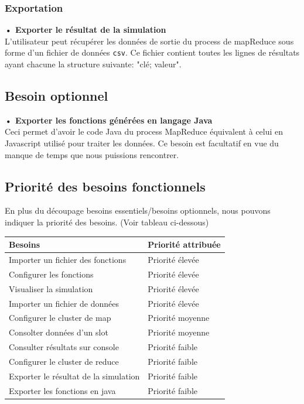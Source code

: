 \documentclass[12pt,a4paper]{article}
\begin{document}
\subsubsection{Exportation}

\textbf{• Exporter le résultat de la simulation\\} L'utilisateur peut récupérer les données de sortie du process de mapReduce sous forme d'un fichier de données {\tt csv}. Ce fichier contient toutes les lignes de résultats ayant chacune la structure suivante: "clé; valeur".


\subsection{Besoin optionnel}

\textbf{• Exporter les fonctions générées en langage Java\\} Ceci permet d'avoir le code Java du process MapReduce équivalent à celui en Javascript utilisé pour traiter les données. Ce besoin est facultatif en vue du manque de temps que nous puissions rencontrer.

\subsection{Priorité des besoins fonctionnels}
En plus du découpage besoins essentiels/besoins optionnels, nous pouvons indiquer la priorité des besoins. (Voir tableau ci-dessous)
\begin{center}
\begin{tabularx}{\textwidth}{|X|X|}
  \hline {\bf Besoins} & {\bf Priorité attribuée} \\[4ex]

  \hline Importer un fichier des fonctions & Priorité élevée\\[2ex]
  \hline Configurer les fonctions & Priorité élevée\\[2ex]
  \hline Visualiser la simulation & Priorité élevée\\[2ex]
  \hline Importer un fichier de données & Priorité élevée\\[2ex]
  \hline Configurer le cluster de map & Priorité moyenne\\[2ex]
  \hline Consolter données d'un slot & Priorité moyenne\\[2ex]
  \hline Consulter résultats sur console & Priorité faible\\[2ex]
  \hline Configurer le cluster de reduce & Priorité faible\\[2ex]
  \hline Exporter le résultat de la simulation & Priorité faible\\[2ex]
  \hline Exporter les fonctions en java & Priorité faible\\[2ex]
  \hline
\end{tabularx}
\end{center}
\end{document}
